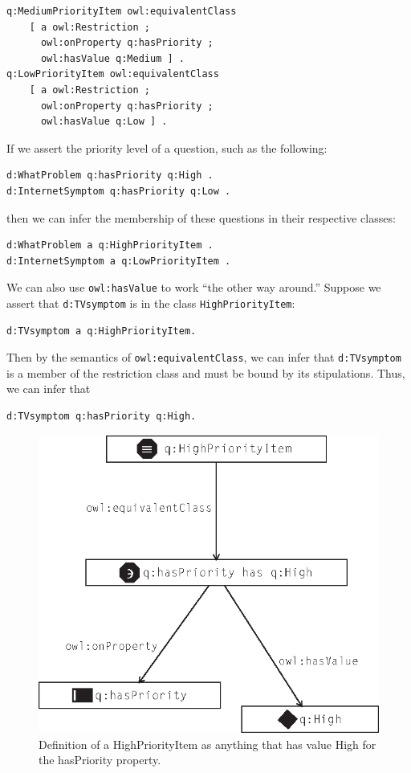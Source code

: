 \begin{lstlisting}
q:MediumPriorityItem owl:equivalentClass
    [ a owl:Restriction ;
      owl:onProperty q:hasPriority ;
      owl:hasValue q:Medium ] .
q:LowPriorityItem owl:equivalentClass 
    [ a owl:Restriction ;
      owl:onProperty q:hasPriority ;
      owl:hasValue q:Low ] .
\end{lstlisting}

If we assert the priority level of a question, such as the following:

\begin{lstlisting}
d:WhatProblem q:hasPriority q:High .
d:InternetSymptom q:hasPriority q:Low .
\end{lstlisting}

then we can infer the membership of these questions in their respective
classes:

\begin{lstlisting}
d:WhatProblem a q:HighPriorityItem .
d:InternetSymptom a q:LowPriorityItem .
\end{lstlisting}

We can also use \texttt{owl:hasValue} to work ``the other way around.'' Suppose
we assert that \texttt{d:TVsymptom} is in the class \texttt{HighPriorityItem}:


\begin{lstlisting}
d:TVsymptom a q:HighPriorityItem.
\end{lstlisting}

Then by the semantics of \texttt{owl:equivalentClass}, we can infer that
\texttt{d:TVsymptom} is a member of the restriction class and must be bound by
its stipulations. Thus, we can infer that

\begin{lstlisting}
d:TVsymptom q:hasPriority q:High.
\end{lstlisting}


\begin{figure}
\centering
\includegraphics[width=5in]{media/ch12/f12-08.eps}
\caption{Definition of a HighPriorityItem as anything that has value High for the
hasPriority property.
}
\label{fig:ch12.08}
\end{figure}




